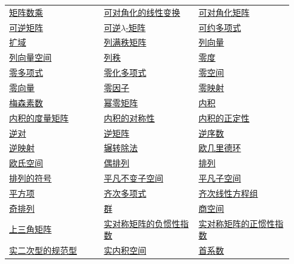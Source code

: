 \begin{longtable}{@{}>{\raggedright\arraybackslash}p{0.31\linewidth}>{\raggedright\arraybackslash}p{0.31\linewidth}>{\raggedright\arraybackslash}p{0.31\linewidth}@{}}
\hyperref[p1:concept:c3-l483]{矩阵数乘} & \hyperref[p1:concept:c5-l241]{可对角化的线性变换} & \hyperref[p1:concept:c5-l1191]{可对角化矩阵}\\
\hyperref[p1:concept:c3-l1016]{可逆矩阵} & \hyperref[p1:concept:c5-l1937]{可逆$\lambda$-矩阵} & \hyperref[p1:concept:c1-l789]{可约多项式}\\
\hyperref[p1:concept:c1-l526]{扩域} & \hyperref[p1:concept:c3-l246]{列满秩矩阵} & \hyperref[p1:concept:c2-l222]{列向量}\\
\hyperref[p1:concept:c2-l222]{列向量空间} & \hyperref[p1:concept:c2-l739]{列秩} & \hyperref[p1:concept:c4-l1459]{零度}\\
\hyperref[p1:concept:c1-l558]{零多项式} & \hyperref[p1:concept:c3-l757]{零化多项式} & \hyperref[p1:concept:c4-l75]{零空间}\\
\hyperref[p1:concept:c2-l222]{零向量} & \hyperref[p1:concept:c1-l7]{零因子} & \hyperref[p1:concept:c3-l7]{零映射}\\
\hyperref[p1:concept:c1-l1974]{梅森素数} & \hyperref[p1:concept:c3-l717]{幂零矩阵} & \hyperref[p1:concept:c6-l6]{内积}\\
\hyperref[p1:concept:c6-l572]{内积的度量矩阵} & \hyperref[p1:concept:c6-l6]{内积的对称性} & \hyperref[p1:concept:c6-l6]{内积的正定性}\\
\hyperref[p1:concept:c3-l1845]{逆对} & \hyperref[p1:concept:c3-l1016]{逆矩阵} & \hyperref[p1:concept:c3-l1845]{逆序数}\\
\hyperref[p1:concept:c4-l1979]{逆映射} & \hyperref[p1:concept:c1-l333]{辗转除法} & \hyperref[p1:concept:c1-l197]{欧几里德环}\\
\hyperref[p1:concept:c6-l6]{欧氏空间} & \hyperref[p1:concept:c3-l1845]{偶排列} & \hyperref[p1:concept:c3-l1812]{排列}\\
\hyperref[p1:concept:c3-l1845]{排列的符号} & \hyperref[p1:concept:c5-l22]{平凡不变子空间} & \hyperref[p1:concept:c4-l639]{平凡子空间}\\
\hyperref[p1:concept:c7-l1027]{平方项} & \hyperref[p1:concept:c1-l1379]{齐次多项式} & \hyperref[p1:concept:c2-l7]{齐次线性方程组}\\
\hyperref[p1:concept:c3-l1845]{奇排列} & \hyperref[p1:concept:c1-l7]{群} & \hyperref[p1:concept:c4-l276]{商空间}\\
\hyperref[p1:concept:c3-l881]{上三角矩阵} & \hyperref[p1:concept:c7-l1565]{实对称矩阵的负惯性指数} & \hyperref[p1:concept:c7-l1565]{实对称矩阵的正惯性指数}\\
\hyperref[p1:concept:c7-l1451]{实二次型的规范型} & \hyperref[p1:concept:c6-l6]{实内积空间} & \hyperref[p1:concept:c1-l558]{首系数}\\

\end{longtable}

